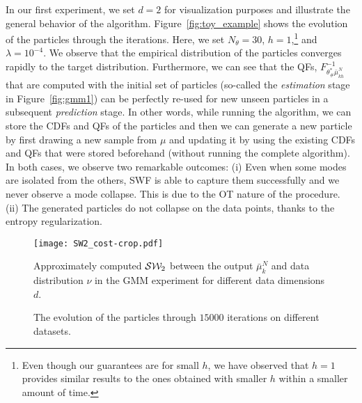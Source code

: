In our first experiment, we set $d=2$ for visualization purposes and illustrate the general behavior of the algorithm. Figure~\ref{fig:toy_example} shows the evolution of the particles through the iterations. Here, we set $N_\theta=30$, $h=1$,\footnote{Even though our guarantees are for small $h$, we have observed that $h=1$ provides similar results to the ones obtained with smaller $h$ within a smaller amount of time.} and $\lambda=10^{-4}$.
%
We observe that the empirical distribution of the particles converges rapidly to the target distribution. Furthermore, we can see that the QFs, $F^{-1}_{\theta^*_\#\bar{\mu}_{kh}^{N}}$ that are computed with the initial set of particles (so-called the \textit{estimation} stage in Figure~\ref{fig:gmm1}) can be perfectly re-used for new unseen particles in a subsequent \textit{prediction} stage. In other words, while running the algorithm, we can store the CDFs and QFs of the particles and then we can generate a new particle by first drawing a new sample from $\mu$ and updating it by using the existing CDFs and QFs that were stored beforehand (without running the complete algorithm).
%
%
%
In both cases, we observe two remarkable outcomes: (i) Even when some modes are isolated from the others, SWF is able to capture them successfully and we never observe a mode collapse. This is due to the OT nature of the procedure. (ii) The generated particles do not collapse on the data points, thanks to the entropy regularization.


\begin{figure}
\begin{centering}
\texttt{[image: SW2\_cost-crop.pdf]}
\par\end{centering}
\caption{Approximately computed ${\cal S}{\cal W}_2$ between the output $\bar{\mu}_{k}^{N}$ and data distribution $\nu$ in the GMM experiment for different data dimensions $d$.
\label{fig:toy_sw}}
\end{figure}


\begin{figure*}[t]
\centering
{}
\hfill
{}
\caption{The evolution of the particles through $15000$ iterations on different datasets.}
\end{figure*}

